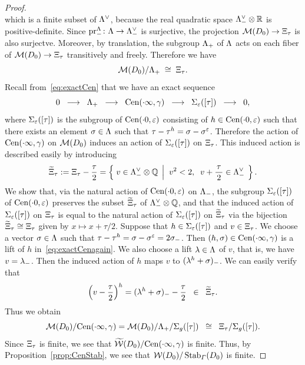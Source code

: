 \documentclass{amsart} %
\begin{document}
\begin{proof}
\begin{equation}
\end{equation}
%
which is a finite subset of $\Lambda^{\vee}$, because 
the real quadratic space 
$ \Lambda_{-}^{\vee}\otimes \mathord{\mathbb{R}}$ is positive-definite.
Since $\operatorname{pr}^{\Lambda}_{-}\colon \Lambda \to \Lambda_{-}^{\vee}$ is surjective,
the projection $\mathord{\mathcal{M}}(D_0) \to \Xi_{\tau}$ is also surjectve.
Moreover, by translation,
the subgroup $\Lambda_{+}$ of $\Lambda$ acts on each fiber of $\mathord{\mathcal{M}}(D_0) \to \Xi_{\tau}$ 
transitively and freely.
Therefore we have 
\[
\mathord{\mathcal{M}}(D_0)/\Lambda_{+} \;\cong \; \Xi_{\tau}. 
\]
Recall from~\eqref{eq:exactCen} that
we have an exact sequence
%
\begin{equation}\label{eq:exactCenagain}
0\;\;\longrightarrow\;\;\Lambda_{+}\;\; \longrightarrow \;\; 
\mathrm{Cen}(\cdot \infty, \gamma)
\;\; \longrightarrow \;\; 
\Sigma_{\varepsilon}([\tau])
\;\; \longrightarrow \;\; 0,
\end{equation}
%
where $\Sigma_{\varepsilon}([\tau])$ is the subgroup of $\mathrm{Cen}(\cdot 0, \varepsilon)$
consisting of $h\in \mathrm{Cen}(\cdot 0, \varepsilon)$ such that 
there exists an element $\sigma\in \Lambda$ such that $\tau-\tau^h=\sigma-\sigma^{\varepsilon}$.
Therefore the action 
of $\mathrm{Cen}(\cdot \infty, \gamma)$ on $\mathord{\mathcal{M}}(D_0)$ induces an action of 
$\Sigma_{\varepsilon}([\tau])$ on $\Xi_{\tau}$. 
This induced action is described easily by introducing 
%
\begin{equation}\label{eq:tilXi}
\widetilde{\Xi}_{\tau}:=\Xi_{\tau} -\dfrac{\tau}{2}
=\left\{\; {v\in \Lambda_{-}^{\vee}\otimes\mathord{\mathbb{Q}}} \; \left\vert \; {\;v^2<2, \;\; v+\dfrac{\tau}{\,2\,}\in \Lambda_{-}^{\vee}} \; \right.\right \}.
\end{equation}
%
We show that, via the natural action of $\mathrm{Cen}(\cdot 0, \varepsilon)$ on $\Lambda_{-}$,
the subgroup 
$\Sigma_{\varepsilon}([\tau])$ of $\mathrm{Cen}(\cdot 0, \varepsilon)$
preserves the subset $\widetilde{\Xi}_{\tau}$ of $\Lambda_{-}^{\vee}\otimes\mathord{\mathbb{Q}}$,
and that 
the induced action of 
$\Sigma_{\varepsilon}([\tau])$ on $\Xi_{\tau}$
is equal to the natural action of $\Sigma_{\varepsilon}([\tau])$ on $\widetilde{\Xi}_{\tau}$
via the 
bijection $\widetilde{\Xi}_{\tau}\cong \Xi_{\tau}$ given by 
$x\mapsto x+\tau/2$.
Suppose that $h\in \Sigma_{\varepsilon}([\tau])$ and $v\in \Xi_{\tau}$.
We choose a vector $\sigma\in \Lambda$ such that $\tau-\tau^h=\sigma-\sigma^\varepsilon=2\sigma_{-}$.
Then $(h, \sigma)\in \mathrm{Cen}(\cdot \infty, \gamma)$ is a lift of $h$ in~\eqref{eq:exactCenagain}.
We also choose a lift $\lambda\in \Lambda$ of $v$,
that is, we have $v=\lambda\sb{-}$.
Then the induced action of $h$ maps $v$ to $(\lambda^h+\sigma)\sb{-}$.
We can easily verify that
\[
\left(v-\dfrac{\tau}{2}\right)^h=(\lambda^h+\sigma)_{-}-\dfrac{\tau}{2}\;\;\in\;\;\widetilde{\Xi}_{\tau}.
\]
 Thus we obtain 
%
\begin{equation}\label{eq:orbitss}
 \MMM(D_0)/\Cen(\dotinf, \gamma)= \MMM(D_0)/\Leechplus/\Sigma_{g}([\tau])\;\;\cong\;\; \Xitau/\Sigma_{g}([\tau]). %
\end{equation}
%
Since $\Xi_{\tau}$ is finite, 
 we see that
$\widetilde{\mathord{\mathcal{W}}}(D_0)/\mathrm{Cen}(\cdot \infty, \gamma)$ is finite.
Thus, by Proposition~\ref{prop:CenStab},
we see that $\mathord{\mathcal{W}}(D_0)/\operatorname{Stab}_{\varGamma}(D_0)$ is finite. 
%
\end{proof}
\end{document}
